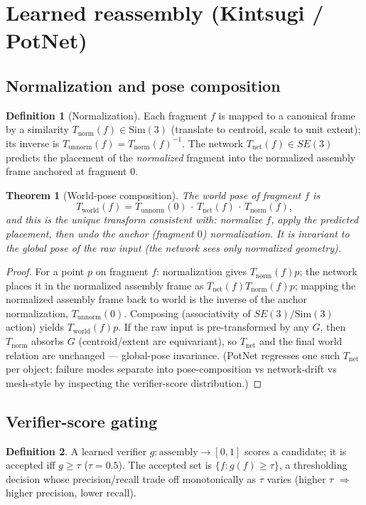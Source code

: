\documentclass[11pt]{article}
\theoremstyle{definition}\newtheorem{definition}{Definition}[section]
\theoremstyle{plain}\newtheorem{theorem}{Theorem}[section]
\begin{document}
\section{Learned reassembly (Kintsugi / PotNet)}
\subsection{Normalization and pose composition}
\begin{definition}[Normalization]
Each fragment $f$ is mapped to a canonical frame by a similarity $T_{\mathrm{norm}}(f)\in\mathrm{Sim}(3)$
(translate to centroid, scale to unit extent); its inverse is $T_{\mathrm{unnorm}}(f)=T_{\mathrm{norm}}(f)^{-1}$.
The network $T_{\mathrm{net}}(f)\in SE(3)$ predicts the placement of the \emph{normalized} fragment into the
normalized assembly frame anchored at fragment $0$.
\end{definition}
\begin{theorem}[World-pose composition]\label{thm:kintsugi}
The world pose of fragment $f$ is
\[T_{\mathrm{world}}(f)=T_{\mathrm{unnorm}}(0)\,\cdot\,T_{\mathrm{net}}(f)\,\cdot\,T_{\mathrm{norm}}(f),\]
and this is the unique transform consistent with: normalize $f$, apply the predicted placement, then undo the
anchor (fragment $0$) normalization. It is invariant to the global pose of the raw input (the network sees
only normalized geometry).
\end{theorem}
\begin{proof}
For a point $p$ on fragment $f$: normalization gives $T_{\mathrm{norm}}(f)p$; the network places it in the
normalized assembly frame as $T_{\mathrm{net}}(f)T_{\mathrm{norm}}(f)p$; mapping the normalized assembly frame
back to world is the inverse of the anchor normalization, $T_{\mathrm{unnorm}}(0)$. Composing (associativity of
$SE(3)/\mathrm{Sim}(3)$ action) yields $T_{\mathrm{world}}(f)p$. If the raw input is pre-transformed by any
$G$, then $T_{\mathrm{norm}}$ absorbs $G$ (centroid/extent are equivariant), so $T_{\mathrm{net}}$ and the
final world relation are unchanged --- global-pose invariance. (PotNet regresses one such $T_{\mathrm{net}}$
per object; failure modes separate into pose-composition vs network-drift vs mesh-style by inspecting the
verifier-score distribution.)
\end{proof}
\subsection{Verifier-score gating}
\begin{definition}
A learned verifier $g:\text{assembly}\to[0,1]$ scores a candidate; it is accepted iff $g\ge\tau$
($\tau=0.5$). The accepted set is $\{f: g(f)\ge\tau\}$, a thresholding decision whose precision/recall trade
off monotonically as $\tau$ varies (higher $\tau$ $\Rightarrow$ higher precision, lower recall).
\end{definition}
\end{document}
